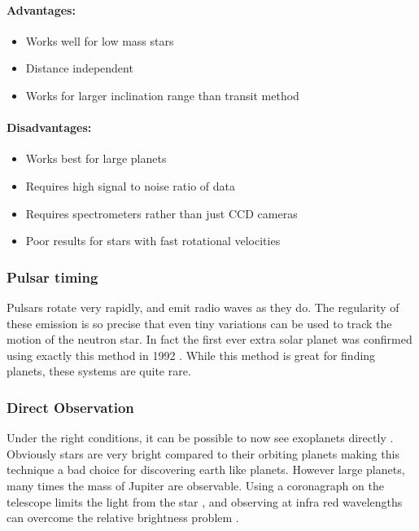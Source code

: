\paragraph{Advantages:}
\begin{itemize}
    \item Works well for low mass stars
    \item Distance independent
    \item Works for larger inclination range than transit method
\end{itemize}

\paragraph{Disadvantages:}
\begin{itemize}
    \item Works best for large planets
    \item Requires high signal to noise ratio of data
    \item Requires spectrometers rather than just CCD cameras
    \item Poor results for stars with fast rotational velocities
\end{itemize}

\subsubsection{Pulsar timing}

Pulsars rotate very rapidly, and emit radio waves as they do. The regularity of these emission is so precise that even tiny variations can be used to track the motion of the neutron star. In fact the first ever extra solar planet was confirmed using exactly this method in 1992 \cite{wolszczan1992planetary}. While this method is great for finding planets, these systems are quite rare.

\subsubsection{Direct Observation}

Under the right conditions, it can be possible to now see exoplanets directly \cite{lafreniere2010directly}\cite{kuzuhara2013direct}\cite{delorme2013direct}. Obviously stars are very bright compared to their orbiting planets making this technique a bad choice for discovering earth like planets. However large planets, many times the mass of Jupiter are observable. Using a coronagraph on the telescope limits the light from the star \cite{kuchner2002coronagraph}, and observing at infra red wavelengths can overcome the relative brightness problem \cite{delorme2013direct}.
